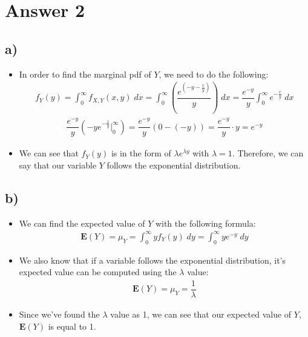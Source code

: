 \documentclass[12pt]{article}
\begin{document}
\section*{Answer 2}
\subsection*{a)}
\begin{itemize}
    \item In order to find the marginal pdf of $Y$, we need to do the following:
    \begin{equation*}
        \begin{split}
            f_Y(y) = \int_{0}^{\infty} f_{X,Y}(x,y)\;dx = \int_{0}^{\infty} \left(\dfrac{e^{(-y-\tfrac{x}{y})}}{y}\right)\;dx = \dfrac{e^{-y}}{y} \int_{0}^{\infty} e^{-\tfrac{x}{y}}\;dx
        \end{split}
    \end{equation*}
    \begin{equation*}
        \begin{split}
            \dfrac{e^{-y}}{y}\left(-ye^{-\tfrac{x}{y}}\Big|_{0}^{\infty}\right) = \dfrac{e^{-y}}{y} (0 - (-y)) = \dfrac{e^{-y}}{y} \cdot y = e^{-y}
        \end{split}
    \end{equation*}
    \item We can see that $f_Y(y)$ is in the form of $\lambda e^{\lambda y}$ with $\lambda = 1$. Therefore, we can say that our variable $Y$ follows the exponential distribution.
\end{itemize} 

\subsection*{b)} 
\begin{itemize}
    \item We can find the expected value of $Y$ with the following formula:
    \begin{equation*}
        \begin{split}
            \textbf{E}(Y) = \mu_Y = \int_{0}^{\infty} yf_{Y}(y)\;dy = \int_{0}^{\infty} ye^{-y}\;dy
        \end{split}
    \end{equation*}
    \item We also know that if a variable follows the exponential distribution, it's expected value can be computed using the $\lambda$ value:
    \begin{equation*}
        \begin{split}
            \textbf{E}(Y) = \mu_Y = \dfrac{1}{\lambda}
        \end{split}
    \end{equation*}
    \item Since we've found the $\lambda$ value as 1, we can see that our expected value of $Y$, $\textbf{E}(Y)$ is equal to 1.
\end{itemize}
\end{document}
